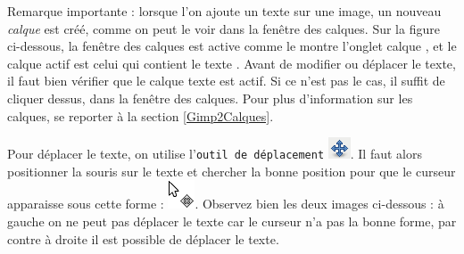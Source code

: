
Remarque importante\label{remarqueCalque} : lorsque l'on ajoute un texte sur une image, un nouveau \emph{calque} est créé, comme on peut le voir dans la fenêtre des calques. Sur la figure ci-dessous, la fenêtre des calques est active comme le montre l'onglet calque , et le calque actif est celui qui contient le texte . Avant de modifier ou déplacer le texte, il faut bien vérifier que le calque texte est actif. Si ce n'est pas le cas, il suffit de cliquer dessus, dans la fenêtre des calques. Pour plus d'information sur les calques, se reporter à la section \vref{Gimp2Calques}. 


Pour déplacer le texte, on utilise l'\texttt{outil de déplacement} \includegraphics[width=.6cm]{./images/image02/iconeDeplace}. Il faut alors positionner la souris sur le texte et chercher la bonne position pour que le curseur apparaisse sous cette forme : \includegraphics[width=.6cm]{./images/image02/iconeTexteBouge}. Observez bien les deux images ci-dessous : à gauche on ne peut pas déplacer le texte car le curseur n'a pas la bonne forme, par contre à droite il est possible de déplacer le texte.


